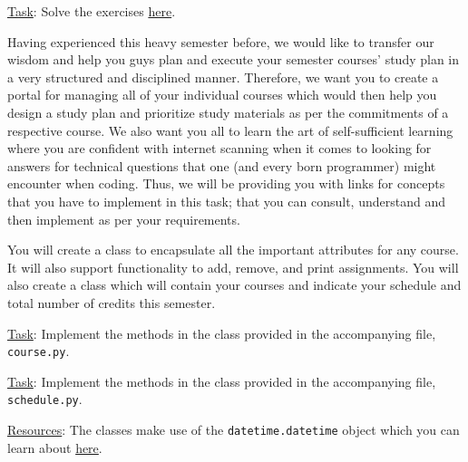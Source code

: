 \documentclass[a4paper]{exam}
\begin{document}
\begin{questions}
\noindent\underline{Task}: Solve the exercises \href{https://pynative.com/python-object-oriented-programming-oop-exercise/}{here}.



Having experienced this heavy semester before, we would like to transfer our wisdom and help you guys plan and execute your semester courses' study plan in a very structured and disciplined manner. Therefore, we want you to create a portal for managing all of your individual courses which would then help you design a study plan and prioritize study materials as per the commitments of a respective course. We also want you all to learn the art of self-sufficient learning where you are confident with internet scanning when it comes to looking for answers for technical questions that one (and every born programmer) might encounter when coding. Thus, we will be providing you with links for concepts that you have to implement in this task; that you can consult, understand and then implement as per your requirements.

You will create a  class to encapsulate all the important attributes for any course. It will also support functionality to add, remove, and print assignments. You will also create a  class which will contain your courses and indicate your schedule and total number of credits this semester.

\noindent\underline{Task}: Implement the methods in the  class provided in the accompanying file, \texttt{course.py}.

\noindent\underline{Task}: Implement the methods in the  class provided in the accompanying file, \texttt{schedule.py}.

\noindent\underline{Resources}: The classes make use of the \texttt{datetime.datetime} object which you can learn about \href{https://betterprogramming.pub/demystifying-python-datetime-module-with-examples-352e6cc72efc}{here}.


\end{questions}
\end{document}
